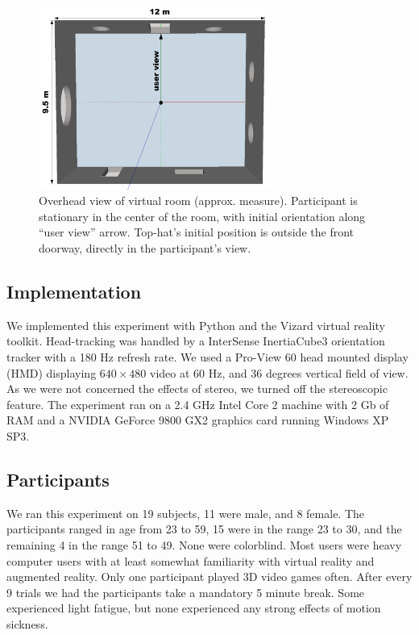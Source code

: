 \documentclass{acmsiggraph}                     %
\begin{document}
\begin{figure}[t]
	\centering
	\includegraphics[width=3in]{figures/augmentedroom.png}
	\caption{Overhead view of virtual room (approx. measure).  Participant is stationary in the center of the room, with initial orientation along ``user view'' arrow.  Top-hat's initial position is outside the front doorway, directly in the participant's view.}
\end{figure}

\subsection{Implementation}

We implemented this experiment with Python and the Vizard virtual reality toolkit.  Head-tracking was handled by a InterSense InertiaCube3 orientation tracker with a 180 Hz refresh rate.  We used a Pro-View 60 head mounted display (HMD) displaying $640\times480$ video at 60 Hz, and 36 degrees vertical field of view.  As we were not concerned the effects of stereo, we turned off the stereoscopic feature.  The experiment ran on a 2.4 GHz Intel Core 2 machine with 2 Gb of RAM and a NVIDIA GeForce 9800 GX2 graphics card running Windows XP SP3.

\subsection{Participants}

We ran this experiment on 19 subjects, 11 were male, and 8 female.  The participants ranged in age from 23 to 59, 15 were in the range 23 to 30, and the remaining 4 in the range 51 to 49.  None were colorblind.  Most users were heavy computer users with at least somewhat familiarity with virtual reality and augmented reality.  Only one participant played 3D video games often.  After every 9 trials we had the participants take a mandatory 5 minute break.  Some experienced light fatigue, but none experienced any strong effects of motion sickness.
\end{document}
